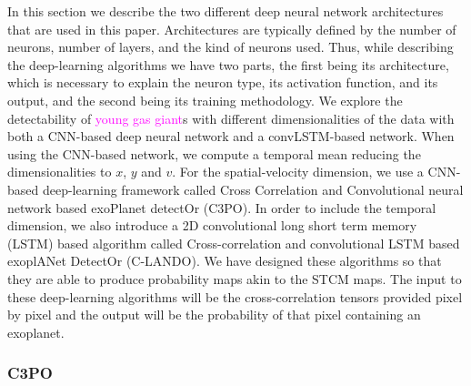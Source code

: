 \documentclass[referee]{aa} %
\newcommand{\newchange}[1]{\textcolor{magenta}{#1}}
\begin{document}
In this section we describe the two different deep neural network architectures that are used in this paper.
Architectures are typically defined by the number of neurons, number of layers, and the kind of neurons used.
Thus, while describing the deep-learning algorithms we have two parts, the first being its architecture, which is necessary to explain the neuron type, its activation function, and its output, and the second being its training methodology.
We explore the detectability of \newchange{young gas giant}s with different dimensionalities of the data with both a CNN-based deep neural network and a convLSTM-based network.
When using the CNN-based network, we compute a temporal mean reducing the dimensionalities to $x$, $y$ and $v$.
For the spatial-velocity dimension, we use a CNN-based deep-learning framework called Cross Correlation and Convolutional neural network based exoPlanet detectOr (C3PO).
In order to include the temporal dimension, we also introduce a 2D convolutional long short term memory (LSTM) based algorithm called Cross-correlation and convolutional LSTM based exoplANet DetectOr (C-LANDO).
We have designed these algorithms so that they are able to produce probability maps akin to the STCM maps. 
The input to these deep-learning algorithms will be the cross-correlation tensors provided pixel by pixel and the output will be the probability of that pixel containing an exoplanet. %

\subsubsection{C3PO}
\end{document}
